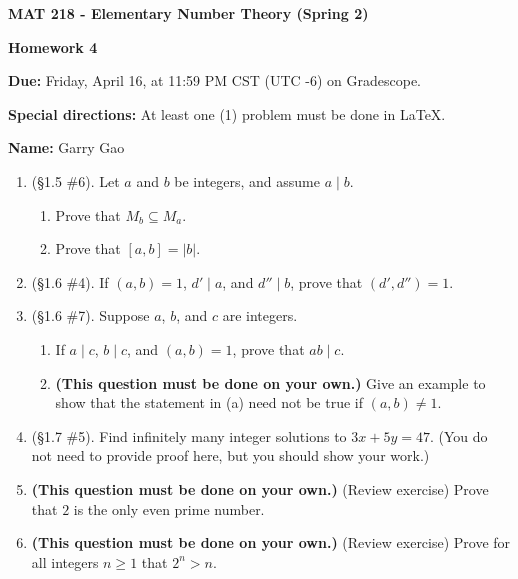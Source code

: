\documentclass[11pt,a4paper]{article}
\begin{document}
\begin{Large}
\centerline{\bf MAT 218 - Elementary Number Theory (Spring 2)}\medskip
\centerline{\bf Homework 4}\medskip
\end{Large}
{\bf Due:} Friday, April 16, at 11:59 PM CST (UTC -6) on Gradescope.

{\bf Special directions:} At least one (1) problem must be done in \LaTeX.

{\bf Name:} Garry Gao


\hrulefill

\begin{enumerate}

	\item (\S 1.5 \#6). Let \(a\) and \(b\) be integers, and assume \(a \mid b\).
		\begin{enumerate}
			\item Prove that \(M_{b} \subseteq M_{a}\).
			\item Prove that \( \left[a,b\right] = |b| \).
		\end{enumerate}

	\item (\S 1.6 \#4). If \((a,b)=1\), \(d' \mid a\), and \(d'' \mid b\), prove that \((d',d'')=1\).

	\item (\S 1.6 \#7). Suppose \(a\), \(b\), and \(c\) are integers.
	\begin{enumerate}
		\item If \(a \mid c\), \(b \mid c\), and \((a,b)=1\), prove that \(ab \mid c\).
		\item \textbf{(This question must be done on your own.)} Give an example to show that the statement in (a) need not be true if \((a,b) \ne 1\).
	\end{enumerate}

	\item (\S 1.7 \#5). Find infinitely many integer solutions to \(3x+5y=47\). (You do not need to provide proof here, but you should show your work.)

	\item \textbf{(This question must be done on your own.)} (Review exercise) Prove that \(2\) is the only even prime number.

	\item \textbf{(This question must be done on your own.)} (Review exercise) Prove for all integers \(n \ge 1\) that \(2^{n} > n\).


\end{enumerate}
\end{document}
